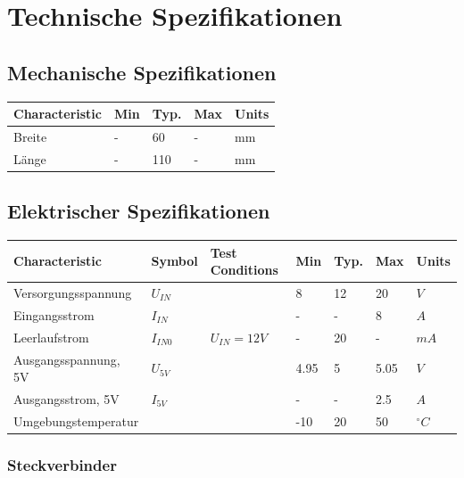 \documentclass[a4paper,10pt]{article}
\begin{document}
\section{Technische Spezifikationen}

\subsection{Mechanische Spezifikationen}

\begin{center}
    \begin{tabular}{| l | l | l | l | l |}
    \hline
    Characteristic & Min & Typ. & Max & Units \\ \hline
    Breite & - & 60 & - & mm \\ \hline
    Länge & - & 110 & - & mm \\ \hline
    
    \end{tabular}
\end{center}

\subsection{Elektrischer Spezifikationen}

\begin{center}
    \begin{tabular}{| l | l | l | l | l | l | l |}
    \hline
    Characteristic 	& Symbol 	& Test Conditions 	& Min 	& Typ. 	& Max 	& Units \\ \hline
    Versorgungsspannung & $U_{IN}$ 	& 			& 8 	& 12 	& 20 	& $V$ \\ \hline
    Eingangsstrom 	& $I_{IN}$ 	& 			& - 	& - 	& 8 	& $A$ \\ \hline
    Leerlaufstrom 	& $I_{IN0}$ 	& $U_{IN} = 12V$	& - 	& 20 	& - 	& $mA$ \\ \hline
    Ausgangsspannung, 5V& $U_{5V}$ 	& 			& 4.95 	& 5 	& 5.05 	& $V$ \\ \hline
    Ausgangsstrom, 5V 	& $I_{5V}$ 	& 			& - 	& - 	& 2.5 	& $A$ \\ \hline
    Umgebungstemperatur &  		& 			& -10 	& 20 	& 50 	& $^\circ C$ \\ \hline
    \end{tabular}
\end{center}

\subsubsection{Steckverbinder}
\end{document}
